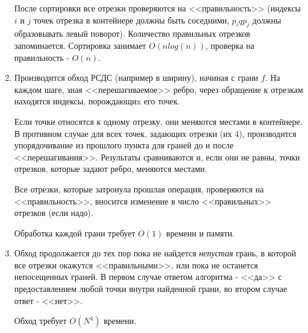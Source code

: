 \documentclass[letterpaper,12pt]{article}
\begin{document}
\begin{enumerate}
\begin{enumerate}
            \end{enumerate}
            \par
            После сортировки все отрезки проверяются на <<правильность>> 
            (индексы $i$ и $j$ точек отрезка в контейнере должны быть соседними,
            $p_i q p_j$ должны образовывать левый поворот). 
            Количество правильных отрезков запоминается. Сортировка занимает 
            $O(nlog(n))$, проверка на правильность - $O(n)$.
      \item Производится обход РСДС (например в ширину), начиная с грани $f$. 
            На каждом шаге, зная <<перешагиваемое>> ребро,
            через обращение к отрезкам находятся индексы, порождающиx его точек. 
            \par
            Если точки относятся к одному отрезку, они меняются местами в контейнере.
            В противном случае для всех точек, задающих отрезки (их 4), производится 
            упорядочивание из прошлого пункта для граней до и после <<перешагивания>>.
            Результаты сравниваются и, если они не равны, точки отрезков, 
            которые задают ребро, меняются местами.
            \par
            Все отрезки, которые затронула прошлая операция, проверяются на
            <<правильность>>, вносится изменение в число <<правильных>> отрезков
            (если надо).
            \par
            Обработка каждой грани требует $O(1)$ времени и памяти. 
      \item Обход продолжается до тех пор пока не найдется \textsl{непустая}
            грань, в которой все отрезки окажутся <<правильными>>, или пока не
            останется непосещенных граней. В первом случае ответом алгоритма - <<да>>
            с предоставлением любой точки внутри найденной грани, во втором
            случае ответ - <<нет>>.
            \par
            Обход требует $O(N^4)$ времени.
\end{enumerate}
\end{document}

